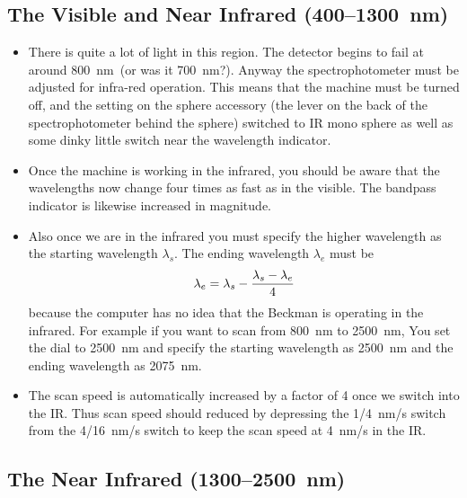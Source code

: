 \documentclass{article}
\begin{document}
\subsection*{The Visible and Near Infrared (400--1300~nm)}

\begin{itemize}
\item
There is quite a lot of light in this region.  The detector begins to fail at around
800~nm\ (or was it 700~nm?).  Anyway the  spectrophotometer must be adjusted for
infra-red operation.  This  means that the machine must be turned off, and the setting
on the sphere accessory (the lever on the back of the spectrophotometer behind the
sphere) switched to IR mono sphere as well as some dinky little switch near the
wavelength indicator.

\item
Once the machine is working in the infrared, you should be aware  that the
wavelengths now change four times as fast as in the visible. The bandpass indicator
is likewise increased in magnitude.

\item
Also once we are in the infrared you must specify the higher wavelength  as the
starting wavelength $\lambda_s$.  The ending wavelength $\lambda_e$ must be 
$$
\lambda_e=\lambda_s-{\lambda_s-\lambda_e\over4}
$$
because the
computer has no idea that the Beckman is operating in the infrared. For
example if you want to scan from 800~nm to 2500~nm, You set the dial to 2500~nm and
specify the starting wavelength as 2500~nm and the ending wavelength as 2075~nm.

\item
The scan speed is automatically increased by a factor of 4 once we switch into the
IR. Thus scan speed should reduced by depressing the 1/4~nm/s switch from the 4/16~nm/s switch to keep the scan speed at 4~nm/s in the IR.

\end{itemize}

\subsection*{The Near Infrared (1300--2500~nm)}
\end{document}
